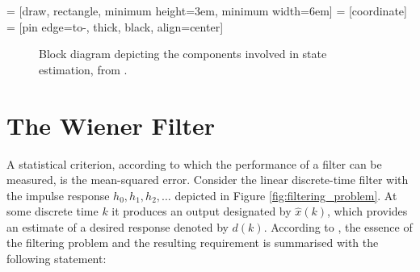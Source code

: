  = [draw, rectangle, minimum height=3em, minimum width=6em]
 = [coordinate]
 = [pin edge={to-, thick, black}, align=center]

\begin{figure}[t]
\centering
{}
\caption{Block diagram depicting the components involved in state estimation, from \cite{haykin2002adaptive}.} \label{fig:state_estimation}
\end{figure}

\section{The Wiener Filter}

A statistical criterion, according to which the performance of a filter can be measured, is the mean-squared error. Consider the linear discrete-time filter with the impulse response $h_0, h_1, h_2, \dots$ depicted in Figure \ref{fig:filtering_problem}. At some discrete time $k$ it produces an output designated by $\hat{x}(k)$, which provides an estimate of a desired response denoted by $d(k)$. According to \citeauthor{haykin2002adaptive} \cite{haykin2002adaptive}, the essence of the filtering problem and the resulting requirement is summarised with the following statement:

